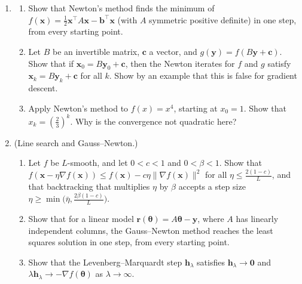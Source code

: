 \documentclass[11pt]{article}
\newcommand{\norm}[1]{\lVert #1 \rVert}
\theoremstyle{definition}
\theoremstyle{plain}
\theoremstyle{remark}
\begin{document}
\begin{enumerate}[leftmargin=*]
\begin{enumerate}[label=(\alph*)]
        \item Find the best step size and the corresponding rate $\rho$. How many steps are needed to reduce the error by a factor $10^{-6}$?
        \item Substitute $x_2 = \frac{u}{3}$. How does the function look in the variables $(x_1, u)$, and how many steps does gradient descent need now with the best step size?
    \end{enumerate}
    \item \begin{enumerate}[label=(\alph*)]
        \item Show that Newton's method finds the minimum of $f(\mathbf{x}) = \frac{1}{2}\mathbf{x}^\top A\mathbf{x} - \mathbf{b}^\top\mathbf{x}$ (with $A$ symmetric positive definite) in one step, from every starting point.
        \item Let $B$ be an invertible matrix, $\mathbf{c}$ a vector, and $g(\mathbf{y}) = f(B\mathbf{y} + \mathbf{c})$. Show that if $\mathbf{x}_0 = B\mathbf{y}_0 + \mathbf{c}$, then the Newton iterates for $f$ and $g$ satisfy $\mathbf{x}_k = B\mathbf{y}_k + \mathbf{c}$ for all $k$. Show by an example that this is false for gradient descent.
        \item Apply Newton's method to $f(x) = x^4$, starting at $x_0 = 1$. Show that $x_k = (\frac{2}{3})^k$. Why is the convergence not quadratic here?
    \end{enumerate}
    \item\label{ex3:armijo} (Line search and Gauss--Newton.)
    \begin{enumerate}[label=(\alph*)]
        \item Let $f$ be $L$-smooth, and let $0 < c < 1$ and $0 < \beta < 1$. Show that $f(\mathbf{x} - \eta\nabla f(\mathbf{x})) \leq f(\mathbf{x}) - c\eta\norm{\nabla f(\mathbf{x})}^2$ for all $\eta \leq \frac{2(1 - c)}{L}$, and that backtracking that multiplies $\eta$ by $\beta$ accepts a step size $\eta \geq \min\big(\bar\eta, \frac{2\beta(1 - c)}{L}\big)$.
        \item Show that for a linear model $\mathbf{r}(\boldsymbol{\theta}) = A\boldsymbol{\theta} - \mathbf{y}$, where $A$ has linearly independent columns, the Gauss--Newton method reaches the least squares solution in one step, from every starting point.
        \item Show that the Levenberg--Marquardt step $\mathbf{h}_\lambda$ satisfies $\mathbf{h}_\lambda \to \mathbf{0}$ and $\lambda\mathbf{h}_\lambda \to -\nabla f(\boldsymbol{\theta})$ as $\lambda \to \infty$.

\end{enumerate}
\end{enumerate}
\end{document}

